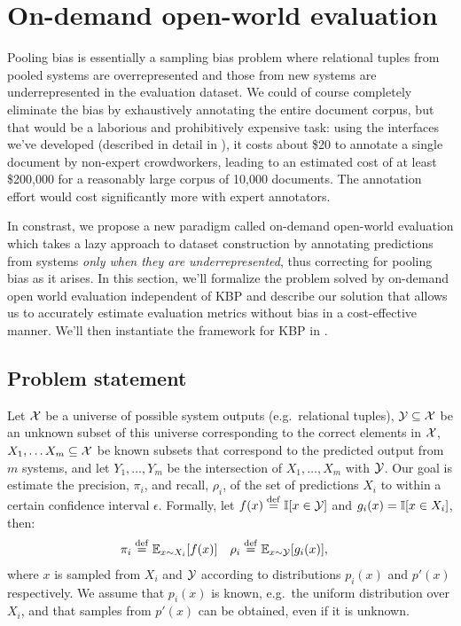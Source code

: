 \section{On-demand open-world evaluation}
\label{sec:method}

Pooling bias is essentially a sampling bias problem where relational tuples from pooled systems are overrepresented and those from new systems are underrepresented in the evaluation dataset.
We could of course completely eliminate the bias by exhaustively annotating the entire document corpus, but that would be a laborious and prohibitively expensive task:
  using the interfaces we've developed (described in detail in ), it costs about \$20 to annotate a single document by non-expert crowdworkers, leading to an estimated cost of at least \$200,000 for a reasonably large corpus of 10,000 documents.
The annotation effort would cost significantly more with expert annotators.

In constrast, we propose a new paradigm called on-demand open-world evaluation which takes a lazy approach to dataset construction by annotating predictions from systems \textit{only when they are underrepresented}, thus correcting for pooling bias as it arises.
In this section, we'll formalize the problem solved by on-demand open world evaluation independent of KBP and describe our solution that allows us to accurately estimate evaluation metrics without bias in a cost-effective manner. 
We'll then instantiate the framework for KBP in .

\subsection{Problem statement}
Let $\mathcal{X}$ be a universe of possible system outputs (e.g.\ relational tuples),
  $\mathcal{Y} \subseteq \mathcal{X}$ be an unknown subset of this universe corresponding to the correct elements in $\mathcal{X}$,
  $X_1, \ldots X_m \subseteq \mathcal{X}$ be known subsets that correspond to the predicted output from $m$ systems,
  and let $Y_1, \ldots, Y_m$ be the intersection of $X_1, \ldots, X_m$ with $\mathcal{Y}$.
Our goal is estimate the precision, $\pi_i$, and recall, $\rho_i$, of the set of predictions $X_i$ to within a certain confidence interval $\epsilon$.
Formally, let $f(x) \stackrel{\rm def}{=} \mathbb{I}[x \in \mathcal{Y}]$ and $g_i(x) = \mathbb{I}[x \in X_i]$, then:
\begin{align*}
  \pi_i  &\stackrel{\rm def}{=} \mathbb{E}_{x \sim X_i}[f(x)] &
  \rho_i &\stackrel{\rm def}{=} \mathbb{E}_{x \sim \mathcal{Y}}[g_i(x)],
\end{align*}
where $x$ is sampled from $X_i$ and $\mathcal{Y}$ according to distributions $p_i(x)$ and $p'(x)$ respectively.
We assume that $p_i(x)$ is known, e.g.\ the uniform distribution over $X_i$, and that samples from $p'(x)$ can be obtained, even if it is unknown.

